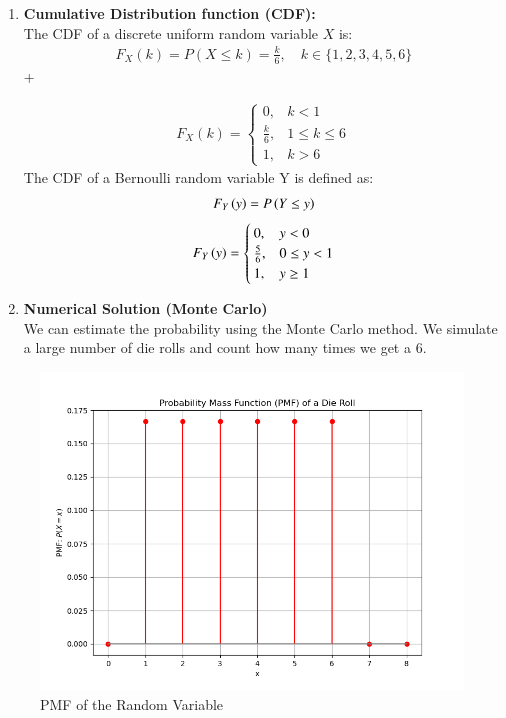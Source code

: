 \documentclass[journal]{IEEEtran}
\numberwithin{equation}{enumi}
\numberwithin{figure}{enumi}
\begin{document}
\begin{enumerate}
    \item \textbf{Cumulative Distribution function (CDF):}\\
    The CDF of a discrete uniform random variable $X$ is:
    \begin{align}
        F_X(k) = P(X \leq k) = \frac{k}{6}, \quad k \in \{1,2,3,4,5,6\}
    \end{align}+

    \begin{align}
        F_X(k) = \begin{cases}
            0, & k < 1 \\
            \frac{k}{6}, & 1 \leq k \leq 6 \\
            1, & k > 6
        \end{cases}
    \end{align}
    The CDF of a Bernoulli random variable Y is defined as:\\
    \begin{align}
    	F_Y\left(y\right) = P\left(Y \leq y\right)
    \end{align}
    \begin{align}
            F_Y\left(y\right) = \begin{cases}
                    0, & y < 0 \\
    \frac{5}{6}, & 0 \leq y < 1 \\
    1, & y \geq 1
            \end{cases}
    \end{align}

\item \textbf{Numerical Solution (Monte Carlo)}\\
We can estimate the probability using the Monte Carlo method.  We simulate a large number of die rolls and count how many times we get a 6.
\end{enumerate}
\begin{figure}[H]
    \centering
    \includegraphics[width=\columnwidth]{figs/pmf_die.png}
    \caption{PMF of the Random Variable}
    \label{fig:enter-label}
\end{figure}
\end{document}
